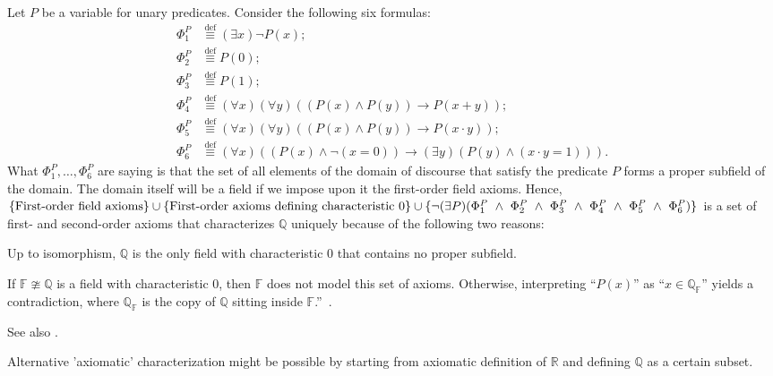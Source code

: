 Let $ P $ be a variable for unary predicates. 
Consider the following six formulas: 
\begin{align} 
\Phi^{P}_{1} &\stackrel{\text{def}}{\equiv} 
(\exists x) \neg P(x); 
\\ \Phi^{P}_{2} &\stackrel{\text{def}}{\equiv} P(0); 
\\ \Phi^{P}_{3} &\stackrel{\text{def}}{\equiv} P(1); 
\\ \Phi^{P}_{4} &\stackrel{\text{def}}{\equiv} 
(\forall x)(\forall y)((P(x) \land P(y)) 
\rightarrow P(x + y)); \\ \Phi^{P}_{5} 
&\stackrel{\text{def}}{\equiv} 
(\forall x)(\forall y)
((P(x) 
\land P(y)) \rightarrow P(x \cdot y));
\\ \Phi^{P}_{6} 
&\stackrel{\text{def}}{\equiv} 
(\forall x)((P(x) \land \neg (x = 0)) \rightarrow
(\exists y)(P(y) \land (x \cdot y = 1))). 
\end{align} 
What $ \Phi^{P}_{1},\ldots,\Phi^{P}_{6} $ are saying is that 
the set of all elements of the domain of discourse 
that satisfy the predicate $ P $ 
forms a proper subfield of the domain. 
The domain itself will be a field 
if we impose upon it the first-order field axioms. 
Hence, 
$ \{ \text{First-order field axioms} \} 
\cup 
\{ \text{First-order axioms defining characteristic $ 0 $} \}
 \cup
\{ \neg (\exists P)(\Phi^{P}_{1} 
~ \land ~ \Phi^{P}_{2} ~ \land ~ 
\Phi^{P}_{3} ~ \land ~ 
\Phi^{P}_{4} ~ \land ~ 
\Phi^{P}_{5} ~ \land ~ \Phi^{P}_{6}) \} $
is a set of first- and second-order axioms that characterizes
$ \mathbb{Q} $ uniquely because of the following two reasons:

Up to isomorphism, 
$ \mathbb{Q} $ is the only field with characteristic $ 0 $ 
that contains no proper subfield.

If $ \mathbb{F} \ncong \mathbb{Q} $ is 
a field with characteristic $ 0 $, 
then $ \mathbb{F} $ does not model this set of axioms. 
Otherwise, interpreting “$ P(x) $” as 
“$ x \in \mathbb{Q}_{\mathbb{F}} $” yields a contradiction, 
where $ \mathbb{Q}_{\mathbb{F}} $ is the copy of $ \mathbb{Q} $ 
sitting inside 
$ \mathbb{F} $.''~\cite{stackexchange:Rational_axioms}.


See also \cite{physics_insights:Rationals}.

\label{sec:Q_subset_of_R}

Alternative 'axiomatic' characterization
might be possible by starting from axiomatic definition of
$\mathbb{R}$ and defining $\mathbb{Q}$ as a certain subset.
\label{sec:Equivalence_classes_of_integer_pairs}

